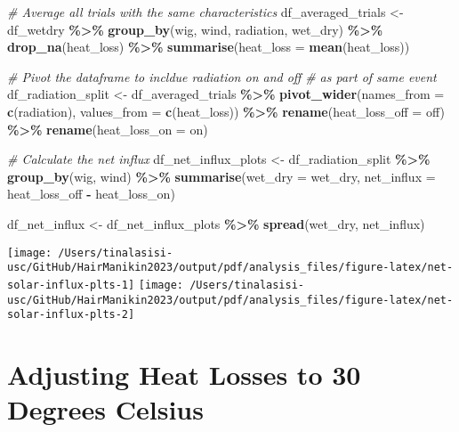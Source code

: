 \documentclass[
]{article}
\newenvironment{Shaded}{\begin{snugshade}}{\end{snugshade}}
\newcommand{\AttributeTok}[1]{\textcolor[rgb]{0.13,0.29,0.53}{#1}}
\newcommand{\CommentTok}[1]{\textcolor[rgb]{0.56,0.35,0.01}{\textit{#1}}}
\newcommand{\FunctionTok}[1]{\textcolor[rgb]{0.13,0.29,0.53}{\textbf{#1}}}
\newcommand{\NormalTok}[1]{#1}
\newcommand{\OtherTok}[1]{\textcolor[rgb]{0.56,0.35,0.01}{#1}}
\newcommand{\SpecialCharTok}[1]{\textcolor[rgb]{0.81,0.36,0.00}{\textbf{#1}}}
\begin{document}
\begin{Shaded}
\begin{Highlighting}[]
\CommentTok{\# Average all trials with the same characteristics}
\NormalTok{df\_averaged\_trials }\OtherTok{\textless{}{-}}\NormalTok{ df\_wetdry }\SpecialCharTok{\%\textgreater{}\%}
    \FunctionTok{group\_by}\NormalTok{(wig, wind, radiation, wet\_dry) }\SpecialCharTok{\%\textgreater{}\%}
    \FunctionTok{drop\_na}\NormalTok{(heat\_loss) }\SpecialCharTok{\%\textgreater{}\%}
    \FunctionTok{summarise}\NormalTok{(}\AttributeTok{heat\_loss =} \FunctionTok{mean}\NormalTok{(heat\_loss))}

\CommentTok{\# Pivot the dataframe to incldue radiation on and off}
\CommentTok{\# as part of same event}
\NormalTok{df\_radiation\_split }\OtherTok{\textless{}{-}}\NormalTok{ df\_averaged\_trials }\SpecialCharTok{\%\textgreater{}\%}
    \FunctionTok{pivot\_wider}\NormalTok{(}\AttributeTok{names\_from =} \FunctionTok{c}\NormalTok{(radiation), }\AttributeTok{values\_from =} \FunctionTok{c}\NormalTok{(heat\_loss)) }\SpecialCharTok{\%\textgreater{}\%}
    \FunctionTok{rename}\NormalTok{(}\AttributeTok{heat\_loss\_off =}\NormalTok{ off) }\SpecialCharTok{\%\textgreater{}\%}
    \FunctionTok{rename}\NormalTok{(}\AttributeTok{heat\_loss\_on =}\NormalTok{ on)}

\CommentTok{\# Calculate the net influx}
\NormalTok{df\_net\_influx\_plots }\OtherTok{\textless{}{-}}\NormalTok{ df\_radiation\_split }\SpecialCharTok{\%\textgreater{}\%}
    \FunctionTok{group\_by}\NormalTok{(wig, wind) }\SpecialCharTok{\%\textgreater{}\%}
    \FunctionTok{summarise}\NormalTok{(}\AttributeTok{wet\_dry =}\NormalTok{ wet\_dry, }\AttributeTok{net\_influx =}\NormalTok{ heat\_loss\_off }\SpecialCharTok{{-}}
\NormalTok{        heat\_loss\_on)}

\NormalTok{df\_net\_influx }\OtherTok{\textless{}{-}}\NormalTok{ df\_net\_influx\_plots }\SpecialCharTok{\%\textgreater{}\%}
    \FunctionTok{spread}\NormalTok{(wet\_dry, net\_influx)}
\end{Highlighting}
\end{Shaded}

\texttt{[image: /Users/tinalasisi-usc/GitHub/HairManikin2023/output/pdf/analysis\_files/figure-latex/net-solar-influx-plts-1]}
\texttt{[image: /Users/tinalasisi-usc/GitHub/HairManikin2023/output/pdf/analysis\_files/figure-latex/net-solar-influx-plts-2]}

\hypertarget{adjusting-heat-losses-to-30-degrees-celsius}{%
\section{Adjusting Heat Losses to 30 Degrees
Celsius}\label{adjusting-heat-losses-to-30-degrees-celsius}}
\end{document}

